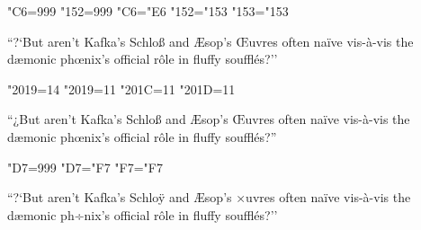 \sfcode"C6=999
\sfcode"152=999
\lccode"C6="E6 %
\lccode"152="153 %
\lccode"153="153

``?`But aren't Kafka's Schloß and Æsop's Œuvres
often naïve vis-à-vis the dæmonic phœnix's official rôle
in fluffy soufflés?''

\kcatcode"2019=14
\catcode"2019=11
\catcode"201C=11
\catcode"201D=11

“¿But aren’t Kafka’s Schloß and Æsop’s Œuvres
often naïve vis-à-vis the dæmonic phœnix’s official rôle
in fluffy soufflés?”

{
\eclmr
\sfcode"D7=999
\lccode"D7="F7 %
\lccode"F7="F7

``?`But aren't Kafka's Schlo^^ff and ^^c6sop's ^^d7uvres
often na^^efve vis-^^e0-vis the d^^e6monic ph^^f7nix's official r^^f4le
in fluffy souffl^^e9s?''
}

\bye
